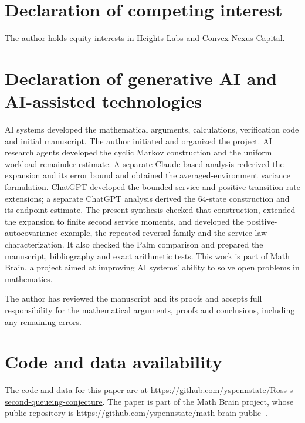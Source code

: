 \documentclass[aap,preprint]{imsart}
\numberwithin{equation}{section}
\theoremstyle{plain}
\theoremstyle{definition}
\newcommand{\1}{\mathbf 1}
\begin{document}
\section*{Declaration of competing interest}
The author holds equity interests in Heights Labs and Convex Nexus Capital.
\section*{Declaration of generative AI and AI-assisted technologies}
AI systems developed the mathematical arguments, calculations, verification code and initial manuscript. The author initiated and organized the project. AI research agents developed the cyclic Markov construction and the uniform workload remainder estimate. A separate Claude-based analysis rederived the expansion and its error bound and obtained the averaged-environment variance formulation. ChatGPT developed the bounded-service and positive-transition-rate extensions; a separate ChatGPT analysis derived the 64-state construction and its endpoint estimate. The present synthesis checked that construction, extended the expansion to finite second service moments, and developed the positive-autocovariance example, the repeated-reversal family and the service-law characterization. It also checked the Palm comparison and prepared the manuscript, bibliography and exact arithmetic tests. This work is part of Math Brain, a project aimed at improving AI systems' ability to solve open problems in mathematics.

The author has reviewed the manuscript and its proofs and accepts full responsibility for the mathematical arguments, proofs and conclusions, including any remaining errors.
\section*{Code and data availability}
The code and data for this paper are at \url{https://github.com/yspennstate/Ross-s-second-queueing-conjecture}. The paper is part of the Math Brain project, whose public repository is \url{https://github.com/yspennstate/math-brain-public}~\cite{MathBrainRepo}.
\begin{supplement}
\end{supplement}
\end{document}
